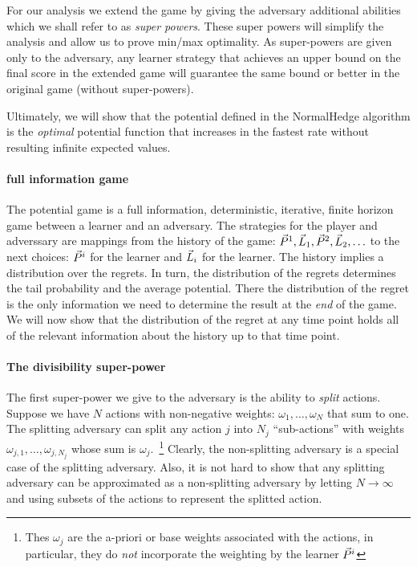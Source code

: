 \documentclass{article}[12pt]
\begin{document}
For our analysis we extend the game by giving the adversary additional
abilities which we shall refer to as {\em super powers}. These super
powers will simplify the analysis and allow us to prove min/max
optimality. As super-powers are given only to the adversary, any
learner strategy that achieves an upper bound on the final score in
the extended game will guarantee the same bound or better in the
original game (without super-powers).

Ultimately, we will show that the potential defined in the NormalHedge
algorithm is the {\em optimal} potential function that increases in
the fastest rate without resulting infinite expected values.

\paragraph*{full information game}
The potential game is a full information, deterministic, iterative,
finite horizon game between a learner and an adversary. The strategies
for the player and adverssary are mappings from the history of the
game: $\vec{P}^{1},\vec{L}_{1},\vec{P}^{2},\vec{L}_{2},\ldots$ to the next
choices: $\vec{P}^{i}$ for the learner and $\vec{L}_{i}$ for the learner.
The history implies a distribution over the regrets. In turn, the
distribution of the regrets determines the tail probability and the
average potential. There the distribution of the regret is the only
information we need to determine the result at the {\em end} of the
game. We will now show that the distribution of the regret at any time
point holds all of the relevant information about the history up to
that time point.

\paragraph*{The divisibility super-power}
The first super-power we give to the adversary is the ability to {\em
  split} actions. Suppose we have $N$ actions with non-negative
weights: $\omega_1,\ldots,\omega_N$ that sum to one.  The splitting
adversary can split any action $j$ into $N_j$ ``sub-actions'' with
weights $\omega_{j,1},\ldots,\omega_{j,N_j}$ whose sum is
$\omega_j$.~\footnote{Thes $\omega_j$ are the a-priori or base weights
  associated with the actions, in particular, they do {\em not}
  incorporate the weighting by the learner $\vec{P}^{i}$}
Clearly, the non-splitting adversary is a special case of the
splitting adversary. Also, it is not hard to show that any splitting
adversary can be approximated as a non-splitting adversary by letting
$N \to \infty$ and using subsets of the actions to represent the
splitted action.
\end{document}
